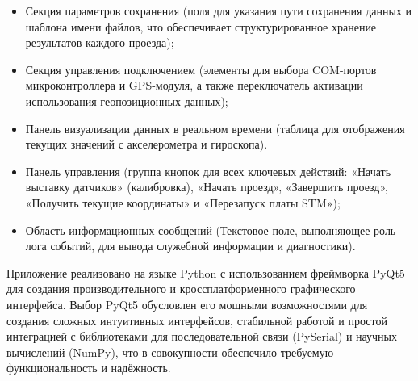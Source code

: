 \begin{itemize}
	\item Секция параметров сохранения (поля для указания пути сохранения данных и шаблона имени файлов, что обеспечивает структурированное хранение результатов каждого проезда);
	\item Секция управления подключением (элементы для выбора COM-портов микроконтроллера и GPS-модуля, а также переключатель активации использования геопозиционных данных);	
	\item Панель визуализации данных в реальном времени (таблица для отображения текущих значений с акселерометра и гироскопа).
	\item Панель управления (группа кнопок для всех ключевых действий: «Начать выставку датчиков» (калибровка), «Начать проезд», «Завершить проезд», «Получить текущие координаты» и «Перезапуск платы STM»);
	\item Область информационных сообщений (Текстовое поле, выполняющее роль лога событий, для вывода служебной информации и диагностики).
\end{itemize}

Приложение реализовано на языке Python с использованием фреймворка PyQt5 для создания производительного и кроссплатформенного графического интерфейса. Выбор PyQt5 обусловлен его мощными возможностями для создания сложных интуитивных интерфейсов, стабильной работой и простой интеграцией с библиотеками для последовательной связи (PySerial) и научных вычислений (NumPy), что в совокупности обеспечило требуемую функциональность и надёжность.




